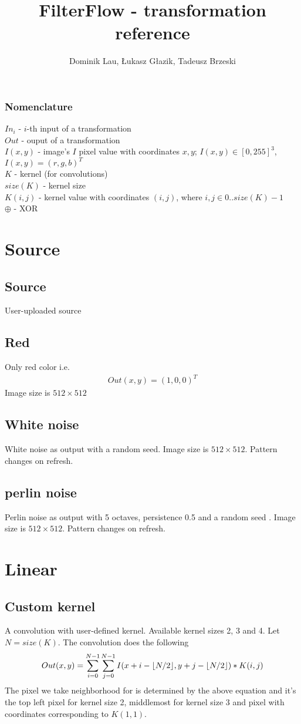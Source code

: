 \documentclass{article}
\title{FilterFlow - transformation reference}
\author{Dominik Lau, Łukasz Głazik, Tadeusz Brzeski}
\DeclarePairedDelimiter\floor{\lfloor}{\rfloor}
\begin{document}
\maketitle
\subsubsection*{Nomenclature}
$In_i$ - $i$-th input of a transformation \\
$Out$ - ouput of a transformation \\
$I(x,y)$ - image's $I$ pixel value with coordinates $x, y$; $I(x,y) \in [0, 255]^3$, $I(x,y) = (r, g, b)^T$ \\
$K$ - kernel (for convolutions) \\
$size(K)$ - kernel size \\
$K(i, j)$ - kernel value with coordinates $(i, j)$, where $i,j\in 0..size(K)-1$ \\
$\oplus$ - XOR 
\section{Source}
\subsection{Source}
User-uploaded source
\subsection{Red}
Only red color i.e.
\begin{gather*}
    Out(x,y) = (1, 0, 0)^T
\end{gather*}
Image size is $512 \times 512$
\subsection{White noise}
White noise as output with a random seed. Image size is $512 \times 512$. Pattern changes on refresh.
\subsection{perlin noise}
Perlin noise as output with 5 octaves, persistence 0.5 and a random seed \cite{perlin}. Image size is $512 \times 512$. Pattern changes on refresh.
\section{Linear}
\subsection{Custom kernel}
A convolution with user-defined kernel. Available kernel sizes 2, 3 and 4.
Let $N = size(K)$. The convolution does the following
\begin{gather*}
    Out(x, y) = \sum_{i=0}^{N-1}\sum_{j=0}^{N-1} I(x + i - \floor*{N/2}, y + j - \floor*{N/2}) * K(i,j)
\end{gather*}
The pixel we take neighborhood for is determined by the above equation and it's the top left pixel for kernel size 2, middlemost for kernel size 3 and pixel with coordinates corresponding to $K(1,1)$.
\end{document}
